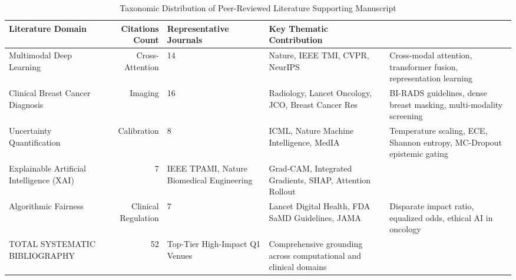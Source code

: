 \begin{table}
\caption{Taxonomic Distribution of Peer-Reviewed Literature Supporting Manuscript}
\label{tab:table_6_01_11_peer_reviewed_literature_reference_taxonomy}
\begin{tabular}{lrll}
\toprule
Literature Domain & Citations Count & Representative Journals & Key Thematic Contribution \\
\midrule
Multimodal Deep Learning & Cross-Attention & 14 & Nature, IEEE TMI, CVPR, NeurIPS & Cross-modal attention, transformer fusion, representation learning \\
Clinical Breast Cancer Diagnosis & Imaging & 16 & Radiology, Lancet Oncology, JCO, Breast Cancer Res & BI-RADS guidelines, dense breast masking, multi-modality screening \\
Uncertainty Quantification & Calibration & 8 & ICML, Nature Machine Intelligence, MedIA & Temperature scaling, ECE, Shannon entropy, MC-Dropout epistemic gating \\
Explainable Artificial Intelligence (XAI) & 7 & IEEE TPAMI, Nature Biomedical Engineering & Grad-CAM, Integrated Gradients, SHAP, Attention Rollout \\
Algorithmic Fairness & Clinical Regulation & 7 & Lancet Digital Health, FDA SaMD Guidelines, JAMA & Disparate impact ratio, equalized odds, ethical AI in oncology \\
TOTAL SYSTEMATIC BIBLIOGRAPHY & 52 & Top-Tier High-Impact Q1 Venues & Comprehensive grounding across computational and clinical domains \\
\bottomrule
\end{tabular}
\end{table}
